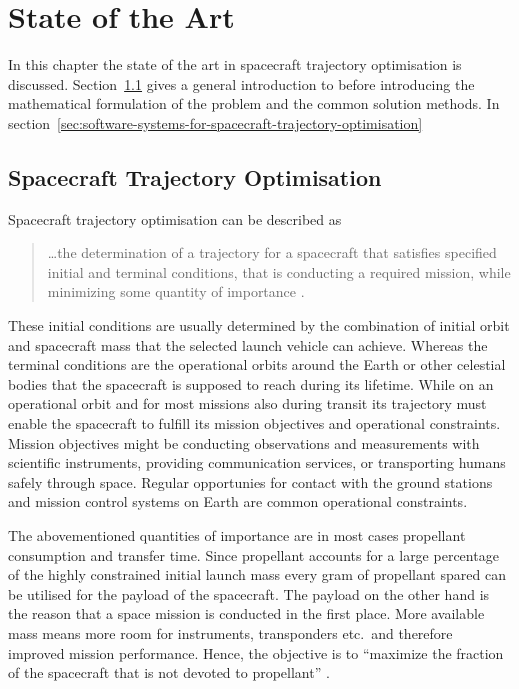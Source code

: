 \chapter{State of the Art}
\label{sec:state-of-the-art}

In this chapter the state of the art in spacecraft trajectory optimisation is discussed.
Section~\ref{sec:spacecraft-trajectory-optimisation} gives a general introduction to \sto before introducing the mathematical formulation of the \sto problem and the common solution methods.
In section~\ref{sec:software-systems-for-spacecraft-trajectory-optimisation} 

\section{Spacecraft Trajectory Optimisation}
\label{sec:spacecraft-trajectory-optimisation}
Spacecraft trajectory optimisation can be described as
\begin{quote}
    \ldots the determination of a trajectory for a spacecraft that satisfies specified initial and terminal conditions, that is conducting a required mission, while minimizing some quantity of importance \autocite[p. 1]{conway-problem-2014}.
\end{quote}

These initial conditions are usually determined by the combination of initial orbit and spacecraft mass that the selected launch vehicle can achieve.
Whereas the terminal conditions are the operational orbits around the Earth or other celestial bodies that the spacecraft is supposed to reach during its lifetime.
While on an operational orbit and for most missions also during transit its trajectory must enable the spacecraft to fulfill its mission objectives and operational constraints.
Mission objectives might be conducting observations and measurements with scientific instruments, providing communication services, or transporting humans safely through space.
Regular opportunies for contact with the ground stations and mission control systems on Earth are common operational constraints.

The abovementioned quantities of importance are in most cases propellant consumption and transfer time.
Since propellant accounts for a large percentage of the highly constrained initial launch mass every gram of propellant spared can be utilised for the payload of the spacecraft.
The payload on the other hand is the reason that a space mission is conducted in the first place.
More available mass means more room for instruments, transponders etc.\ and therefore improved mission performance.
Hence, the objective is to \enquote{maximize the fraction of the spacecraft that is not devoted to propellant} \autocite[p. 1]{conway-problem-2014}.

